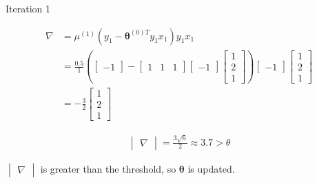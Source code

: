 \documentclass[a4paper, 10pt, twoside]{article}
\begin{document}
\begin{enumerate}[a)]
          Iteration 1

          \begin{align*}
              \nabla
               & =
              \mu^{(1)}(y_1-\bm{\theta}^{(0)T}y_1x_1)y_1x_1 \\
               & =
              \frac{0.5}{1}
              \left(
              \begin{bmatrix}
                      -1
                  \end{bmatrix}
              -
              \begin{bmatrix}
                      1 & 1 & 1
                  \end{bmatrix}
              \begin{bmatrix}
                      -1
                  \end{bmatrix}
              \begin{bmatrix}
                      1 \\ 2 \\ 1
                  \end{bmatrix}
              \right)
              \begin{bmatrix}
                  -1
              \end{bmatrix}
              \begin{bmatrix}
                  1 \\ 2 \\ 1
              \end{bmatrix}                    \\
               & =
              -\frac{3}{2}
              \begin{bmatrix}
                  1 \\ 2 \\ 1
              \end{bmatrix}
          \end{align*}

          \begin{align*}
              \begin{vmatrix}
                  \nabla
              \end{vmatrix} = \frac{3\sqrt{6}}{2} \approx 3.7 > \theta
          \end{align*}

          $\begin{vmatrix} \nabla \end{vmatrix}$ is greater than the threshold, so $ \bm{\theta} $ is updated.


\end{enumerate}
\end{document}
